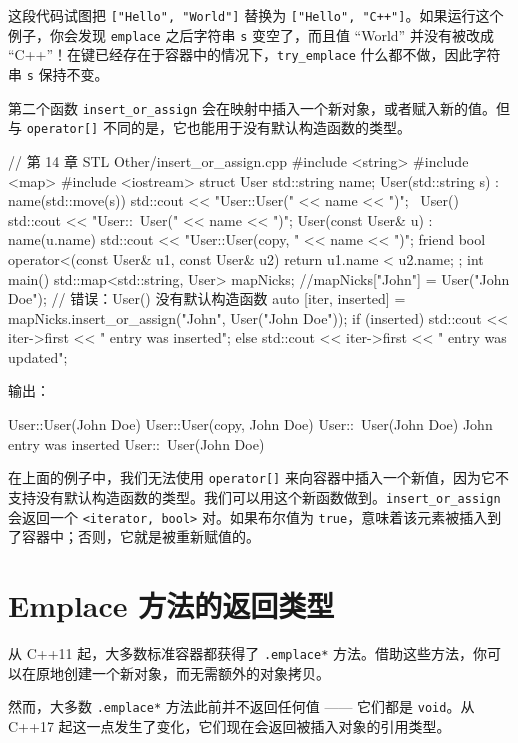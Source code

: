 这段代码试图把 \texttt{["Hello", "World"]} 替换为 \texttt{["Hello", "C++"]}。如果运行这个例子，你会发现 \texttt{emplace} 之后字符串 \texttt{s} 变空了，而且值 “World” 并没有被改成 “C++”！在键已经存在于容器中的情况下，\texttt{try\_emplace} 什么都不做，因此字符串 \texttt{s} 保持不变。


第二个函数 \texttt{insert\_or\_assign} 会在映射中插入一个新对象，或者赋入新的值。但与 \texttt{operator[]} 不同的是，它也能用于没有默认构造函数的类型。

\begin{codebox}[cpp]
// 第 14 章 STL Other/insert_or_assign.cpp
#include <string>
#include <map>
#include <iostream>
struct User {
std::string name;
User(std::string s) : name(std::move(s)) {
std::cout << "User::User(" << name << ")\n";
}
~User() {
std::cout << "User::~User(" << name << ")\n";
}
User(const User& u) : name(u.name) {
std::cout << "User::User(copy, " << name << ")\n";
}
friend bool operator<(const User& u1, const User& u2) {
return u1.name < u2.name;
}
};
int main() {
std::map<std::string, User> mapNicks;
//mapNicks["John"] = User("John Doe"); // 错误：User() 没有默认构造函数
auto [iter, inserted] = mapNicks.insert_or_assign("John", User("John Doe"));
if (inserted)
std::cout << iter->first << " entry was inserted\n";
else
std::cout << iter->first << " entry was updated\n";
}
\end{codebox}

输出：

\begin{codebox}
User::User(John Doe)
User::User(copy, John Doe)
User::~User(John Doe)
John entry was inserted
User::~User(John Doe)
\end{codebox}

在上面的例子中，我们无法使用 \texttt{operator[]} 来向容器中插入一个新值，因为它不支持没有默认构造函数的类型。我们可以用这个新函数做到。\texttt{insert\_or\_assign} 会返回一个 \texttt{<iterator, bool>} 对。如果布尔值为 \texttt{true}，意味着该元素被插入到了容器中；否则，它就是被重新赋值的。


\section{Emplace 方法的返回类型}

从 C++11 起，大多数标准容器都获得了 \texttt{.emplace*} 方法。借助这些方法，你可以在原地创建一个新对象，而无需额外的对象拷贝。

然而，大多数 \texttt{.emplace*} 方法此前并不返回任何值 —— 它们都是 \texttt{void}。从 C++17 起这一点发生了变化，它们现在会返回被插入对象的引用类型。

